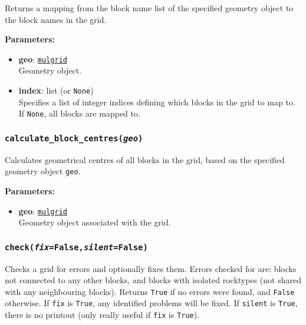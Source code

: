 Returns a mapping from the block name list of the specified geometry object to the block names in the grid.

\textbf{Parameters:}
\begin{itemize}
\item \textbf{geo}: \hyperref[mulgrids]{\texttt{mulgrid}}\\
  Geometry object.
\item \textbf{index}: list (or \texttt{None})\\
  Specifies a list of integer indices defining which blocks in the grid to map to. If \texttt{None}, all blocks are mapped to.
\end{itemize}

\begin{snugshade}
\subsubsection{\texttt{calculate\_block\_centres(\emph{geo})}}
\end{snugshade}
\label{sec:t2grid:calculate_block_centres}

Calculates geometrical centres of all blocks in the grid, based on the specified geometry object \texttt{geo}.

\textbf{Parameters:}
\begin{itemize}
\item \textbf{geo}: \hyperref[mulgrids]{\texttt{mulgrid}}\\
  Geometry object associated with the grid.
\end{itemize}

\begin{snugshade}
\subsubsection{\texttt{check(\emph{fix}=False,\emph{silent}=False)}}
\end{snugshade}
\label{sec:t2grid:check}

Checks a grid for errors and optionally fixes them.  Errors checked for are: blocks not connected to any other blocks, and blocks with isolated rocktypes (not shared with any neighbouring blocks).  Returns \texttt{True} if no errors were found, and \texttt{False} otherwise.  If \texttt{fix} is \texttt{True}, any identified problems will be fixed.  If \texttt{silent} is \texttt{True}, there is no printout (only really useful if \texttt{fix} is \texttt{True}).


